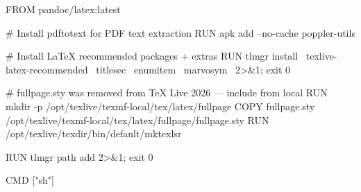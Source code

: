 FROM pandoc/latex:latest

# Install pdftotext for PDF text extraction
RUN apk add --no-cache poppler-utils

# Install LaTeX recommended packages + extras
RUN tlmgr install \
  texlive-latex-recommended \
  titlesec \
  enumitem \
  marvosym \
  2>&1; exit 0

# fullpage.sty was removed from TeX Live 2026 — include from local
RUN mkdir -p /opt/texlive/texmf-local/tex/latex/fullpage
COPY fullpage.sty /opt/texlive/texmf-local/tex/latex/fullpage/fullpage.sty
RUN /opt/texlive/texdir/bin/default/mktexlsr

RUN tlmgr path add 2>&1; exit 0

CMD ["sh"]

